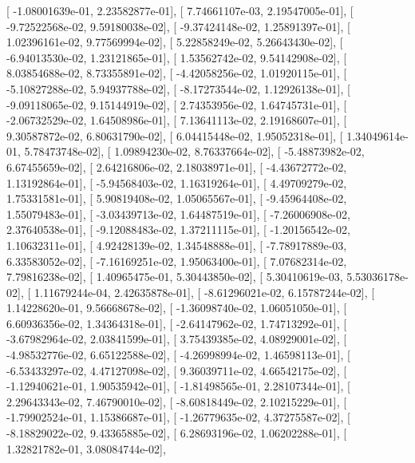 \documentclass{article}
\begin{document}
       [ -1.08001639e-01,   2.23582877e-01],
       [  7.74661107e-03,   2.19547005e-01],
       [ -9.72522568e-02,   9.59180038e-02],
       [ -9.37424148e-02,   1.25891397e-01],
       [  1.02396161e-02,   9.77569994e-02],
       [  5.22858249e-02,   5.26643430e-02],
       [ -6.94013530e-02,   1.23121865e-01],
       [  1.53562742e-02,   9.54142908e-02],
       [  8.03854688e-02,   8.73355891e-02],
       [ -4.42058256e-02,   1.01920115e-01],
       [ -5.10827288e-02,   5.94937788e-02],
       [ -8.17273544e-02,   1.12926138e-01],
       [ -9.09118065e-02,   9.15144919e-02],
       [  2.74353956e-02,   1.64745731e-01],
       [ -2.06732529e-02,   1.64508986e-01],
       [  7.13641113e-02,   2.19168607e-01],
       [  9.30587872e-02,   6.80631790e-02],
       [  6.04415448e-02,   1.95052318e-01],
       [  1.34049614e-01,   5.78473748e-02],
       [  1.09894230e-02,   8.76337664e-02],
       [ -5.48873982e-02,   6.67455659e-02],
       [  2.64216806e-02,   2.18038971e-01],
       [ -4.43672772e-02,   1.13192864e-01],
       [ -5.94568403e-02,   1.16319264e-01],
       [  4.49709279e-02,   1.75331581e-01],
       [  5.90819408e-02,   1.05065567e-01],
       [ -9.45964408e-02,   1.55079483e-01],
       [ -3.03439713e-02,   1.64487519e-01],
       [ -7.26006908e-02,   2.37640538e-01],
       [ -9.12088483e-02,   1.37211115e-01],
       [ -1.20156542e-02,   1.10632311e-01],
       [  4.92428139e-02,   1.34548888e-01],
       [ -7.78917889e-03,   6.33583052e-02],
       [ -7.16169251e-02,   1.95063400e-01],
       [  7.07682314e-02,   7.79816238e-02],
       [  1.40965475e-01,   5.30443850e-02],
       [  5.30410619e-03,   5.53036178e-02],
       [  1.11679244e-04,   2.42635878e-01],
       [ -8.61296021e-02,   6.15787244e-02],
       [  1.14228620e-01,   9.56668678e-02],
       [ -1.36098740e-02,   1.06051050e-01],
       [  6.60936356e-02,   1.34364318e-01],
       [ -2.64147962e-02,   1.74713292e-01],
       [ -3.67982964e-02,   2.03841599e-01],
       [  3.75439385e-02,   4.08929001e-02],
       [ -4.98532776e-02,   6.65122588e-02],
       [ -4.26998994e-02,   1.46598113e-01],
       [ -6.53433297e-02,   4.47127098e-02],
       [  9.36039711e-02,   4.66542175e-02],
       [ -1.12940621e-01,   1.90535942e-01],
       [ -1.81498565e-01,   2.28107344e-01],
       [  2.29643343e-02,   7.46790010e-02],
       [ -8.60818449e-02,   2.10215229e-01],
       [ -1.79902524e-01,   1.15386687e-01],
       [ -1.26779635e-02,   4.37275587e-02],
       [ -8.18829022e-02,   9.43365885e-02],
       [  6.28693196e-02,   1.06202288e-01],
       [  1.32821782e-01,   3.08084744e-02],
\end{document}
